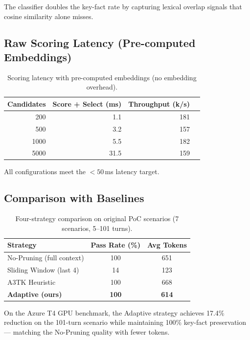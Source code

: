 \documentclass[11pt,a4paper]{article}
\begin{document}
The classifier doubles the key-fact rate by capturing lexical overlap signals that
cosine similarity alone misses.

\subsection{Raw Scoring Latency (Pre-computed Embeddings)}

\begin{table}[H]
\centering
\caption{Scoring latency with pre-computed embeddings (no embedding overhead).}
\label{tab:latency}
\begin{tabular}{rrrr}
\toprule
Candidates & Score + Select (ms) & Throughput (k/s) \\
\midrule
200 & 1.1 & 181 \\
500 & 3.2 & 157 \\
1000 & 5.5 & 182 \\
5000 & 31.5 & 159 \\
\bottomrule
\end{tabular}
\end{table}

All configurations meet the $<50$\,ms latency target.

\subsection{Comparison with Baselines}

\begin{table}[H]
\centering
\caption{Four-strategy comparison on original PoC scenarios (7 scenarios, 5--101 turns).}
\label{tab:baselines}
\begin{tabular}{lcc}
\toprule
Strategy & Pass Rate (\%) & Avg Tokens \\
\midrule
No-Pruning (full context) & 100 & 651 \\
Sliding Window (last 4) & 14 & 123 \\
A3TK Heuristic & 100 & 668 \\
\textbf{Adaptive (ours)} & \textbf{100} & \textbf{614} \\
\bottomrule
\end{tabular}
\end{table}

On the Azure T4 GPU benchmark, the Adaptive strategy achieves 17.4\% reduction
on the 101-turn scenario while maintaining 100\% key-fact preservation --- matching
the No-Pruning quality with fewer tokens.

\end{document}
